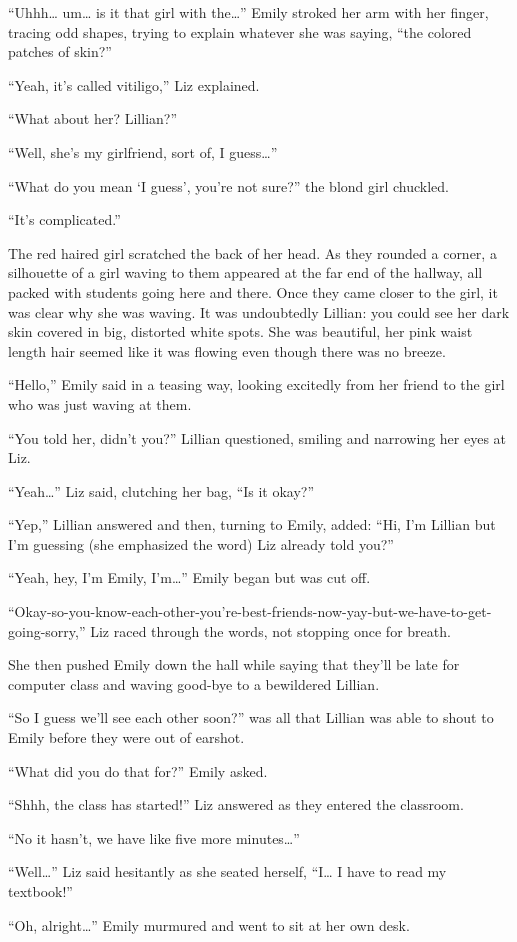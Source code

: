 “Uhhh… um… is it that girl with the…” Emily stroked her arm with her finger, tracing odd shapes, trying to explain whatever she was saying, “the colored patches of skin?”

“Yeah, it's called vitiligo,” Liz explained.

“What about her? Lillian?”

“Well, she's my girlfriend, sort of, I guess…”

“What do you mean ‘I guess', you're not sure?” the blond girl chuckled.

“It's complicated.”

The red haired girl scratched the back of her head. As they rounded a corner, a silhouette of a girl waving to them appeared at the far end of the hallway, all packed with students going here and there. Once they came closer to the girl, it was clear why she was waving. It was undoubtedly Lillian: you could see her dark skin covered in big, distorted white spots. She was beautiful, her pink waist length hair seemed like it was flowing even though there was no breeze.

“Hello,” Emily said in a teasing way, looking excitedly from her friend to the girl who was just waving at them.

“You told her, didn't you?” Lillian questioned, smiling and narrowing her eyes at Liz.

“Yeah…” Liz said, clutching her bag, “Is it okay?”

“Yep,” Lillian answered and then, turning to Emily, added: “Hi, I'm Lillian but I'm guessing (she emphasized the word) Liz already told you?”

“Yeah, hey, I'm Emily, I'm…” Emily began but was cut off.

“Okay-so-you-know-each-other-you're-best-friends-now-yay-but-we-have-to-get-going-sorry,” Liz raced through the words, not stopping once for breath.

She then pushed Emily down the hall while saying that they'll be late for computer class and waving good-bye to a bewildered Lillian.

“So I guess we'll see each other soon?” was all that Lillian was able to shout to Emily before they were out of earshot.

“What did you do that for?” Emily asked.

“Shhh, the class has started!” Liz answered as they entered the classroom.

“No it hasn't, we have like five more minutes…”

“Well…” Liz said hesitantly as she seated herself, “I… I have to read my textbook!”

“Oh, alright…” Emily murmured and went to sit at her own desk.